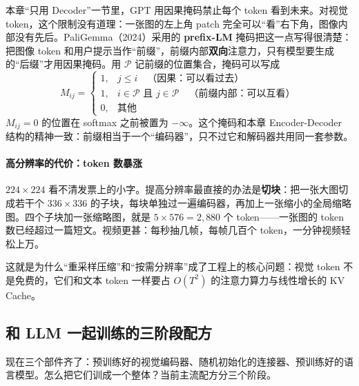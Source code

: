 本章“只用 Decoder”一节里，GPT 用因果掩码禁止每个 token 看到未来。对视觉 token，这个限制没有道理：一张图的左上角 patch 完全可以“看”右下角，图像内部没有先后。PaliGemma（2024）采用的 \textbf{prefix-LM} 掩码把这一点写得很清楚：把图像 token 和用户提示当作“前缀”，前缀内部\textbf{双向}注意力，只有模型要生成的“后缀”才用因果掩码。用 $\mathcal{P}$ 记前缀的位置集合，掩码可以写成
\begin{equation}
    M_{ij} =
    \begin{cases}
        1, & j \le i \quad \text{（因果：可以看过去）} \\
        1, & i \in \mathcal{P} \text{ 且 } j \in \mathcal{P} \quad \text{（前缀内部：可以互看）} \\
        0, & \text{其他}
    \end{cases}
\end{equation}
$M_{ij} = 0$ 的位置在 softmax 之前被置为 $-\infty$。这个掩码和本章 Encoder-Decoder 结构的精神一致：前缀相当于一个“编码器”，只不过它和解码器共用同一套参数。

\paragraph{高分辨率的代价：token 数暴涨}

$224 \times 224$ 看不清发票上的小字。提高分辨率最直接的办法是\textbf{切块}：把一张大图切成若干个 $336 \times 336$ 的子块，每块单独过一遍编码器，再加上一张缩小的全局缩略图。四个子块加一张缩略图，就是 $5 \times 576 = 2{,}880$ 个 token——一张图的 token 数已经超过一篇短文。视频更甚：每秒抽几帧，每帧几百个 token，一分钟视频轻松上万。

这就是为什么“重采样压缩”和“按需分辨率”成了工程上的核心问题：视觉 token 不是免费的，它们和文本 token 一样要占 $O(T^2)$ 的注意力算力与线性增长的 KV Cache。

\subsection{和 LLM 一起训练的三阶段配方}

现在三个部件齐了：预训练好的视觉编码器、随机初始化的连接器、预训练好的语言模型。怎么把它们训成一个整体？当前主流配方分三个阶段。

